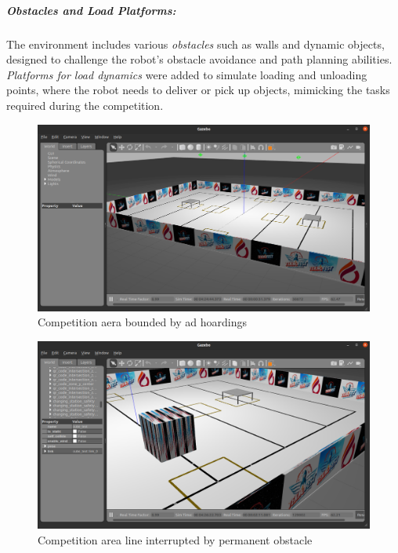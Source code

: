 \documentclass[../../main]{subfiles}
\begin{document}
\subparagraph{Obstacles and Load Platforms:}
The environment includes various \emph{obstacles} such as walls and 
dynamic objects, designed to challenge the robot's obstacle avoidance and path planning abilities. 
\emph{Platforms for load dynamics} were added to simulate loading and unloading points, where the robot needs to 
deliver or pick up objects, mimicking the tasks required during the competition.
    
    \begin{figure}[H]
        \centering
    \includegraphics[width=\textwidth]{fig/walls.png}
    \caption{Competition aera bounded by ad hoardings}
    \label{Walls model} %
    \end{figure}

    \begin{figure}[H]
        \centering
    \includegraphics[width=\textwidth]{fig/load.png}
    \caption{Competition area line interrupted by permanent obstacle}
    \label{Permanent obstacle} %
    \end{figure}
\end{document}
